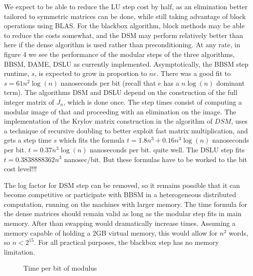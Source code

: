 \documentclass{acm_proc_article-sp}
\begin{document}
We expect to be able to reduce the LU step cost
by half, as an elimination better tailored to symmetric matrices can be done, while still taking
advantage of block operations using BLAS. For the blackbox algorithm, block methods may 
be able to reduce the costs somewhat, and the DSM may perform relatively better than
here if the dense \charpoly{} algorithm \cite{Pernet03} %
is used rather than preconditioning.
At any rate, in figure 4 we see the performance of the modular steps of the three algorithms,
BBSM, DAME, DSLU as currently implemented.
Asymptotically, the BBSM step runtime, $s$, is expected to grow in
proportion to $ne$. There was a good fit to $s = 61 n^2\log(n)$ nanoseconds per bit
(recall that $e$ has a $n\log(n)$ dominant term).
The algorithms DSM and DSLU depend on the construction of the full integer matrix of 
$J_n$, which is done once.  The step times consist of computing a modular
image of that and proceeding with an elimination on the image.
The implementation of the Krylov matrix construction in the \minpoly{} algorithm of $DSM$,
uses a technique of recursive doubling to better exploit fast matrix multiplication,
and gets a step time $s$ which fits the formula 
$t = 1.8   n^3  + 0.16  n^3 \log(n)$ nanoseconds per bit.
$t = 0.37 n^3 \log(n)$ nanoseconds per bit.
quite well.  
The DSLU step fits 
$t = 0.3838888362 n^3$ nanosec/bit.
But these formulas have to be worked to the bit cost level!!!

The log factor for DSM step can be removed, so it remains possible that it can become 
competitive or participate with BBSM in a heterogeneous distributed computation, running
on the machines with larger memory.  
The time formula for the dense matrices should remain valid as long as the modular
step fits in main memory. After than swapping would dramatically increase times.
Assuming a memory capable of holding a 2GB virtual memory,
this would allow for $n^2$ words, so $n < 2^{15}$.  For all practical purposes,
the blackbox step has no memory limitation.
\begin{figure}[h]
\caption{Time per bit of modulus}
\end{figure}
\end{document}

